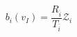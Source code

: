 \documentclass[12pt]{article}
\begin{document}
\begin{equation}
    \nonumber b_i(v_I) = \frac{R_{\overline{i}}}{T_{\overline{i}}} \mathcal{Z}_i
\end{equation}
\end{document}
